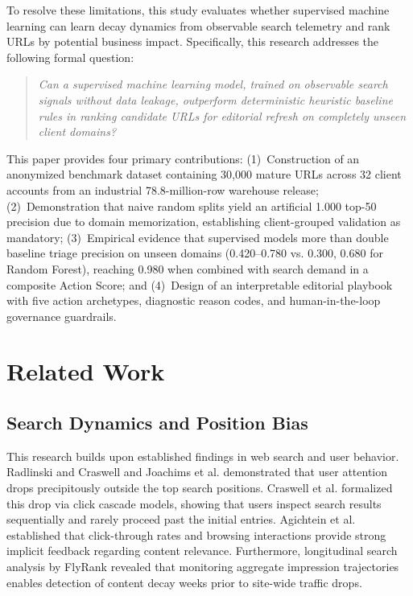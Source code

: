 \documentclass[conference]{IEEEtran}
\begin{document}
To resolve these limitations, this study evaluates whether supervised machine learning can learn decay dynamics from observable search telemetry and rank URLs by potential business impact. Specifically, this research addresses the following formal question:
\begin{quote}
\textit{Can a supervised machine learning model, trained on observable search signals without data leakage, outperform deterministic heuristic baseline rules in ranking candidate URLs for editorial refresh on completely unseen client domains?}
\end{quote}

This paper provides four primary contributions:
(1)~Construction of an anonymized benchmark dataset containing 30,000 mature URLs across 32 client accounts from an industrial 78.8-million-row warehouse release;
(2)~Demonstration that naive random splits yield an artificial 1.000 top-50 precision due to domain memorization, establishing client-grouped validation as mandatory;
(3)~Empirical evidence that supervised models more than double baseline triage precision on unseen domains (0.420--0.780 vs. 0.300, 0.680 for Random Forest), reaching 0.980 when combined with search demand in a composite Action Score; and
(4)~Design of an interpretable editorial playbook with five action archetypes, diagnostic reason codes, and human-in-the-loop governance guardrails.

\section{Related Work}
\subsection{Search Dynamics and Position Bias}
This research builds upon established findings in web search and user behavior. Radlinski and Craswell \cite{radlinski2010comparing} and Joachims et al. \cite{joachims2017accurately} demonstrated that user attention drops precipitously outside the top search positions. Craswell et al. \cite{craswell2008experimental} formalized this drop via click cascade models, showing that users inspect search results sequentially and rarely proceed past the initial entries. Agichtein et al. \cite{agichtein2006improving} established that click-through rates and browsing interactions provide strong implicit feedback regarding content relevance. Furthermore, longitudinal search analysis by FlyRank \cite{flyrank2026whitepaper} revealed that monitoring aggregate impression trajectories enables detection of content decay weeks prior to site-wide traffic drops.
\end{document}
